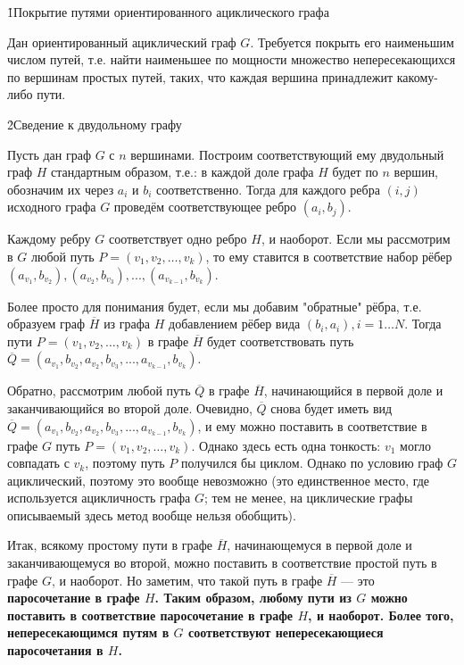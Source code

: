 \h1{Покрытие путями ориентированного ациклического графа}

Дан ориентированный ациклический граф $G$. Требуется покрыть его наименьшим числом путей, т.е. найти наименьшее по мощности множество непересекающихся по вершинам простых путей, таких, что каждая вершина принадлежит какому-либо пути.


\h2{Сведение к двудольному графу}

Пусть дан граф $G$ с $n$ вершинами. Построим соответствующий ему двудольный граф $H$ стандартным образом, т.е.: в каждой доле графа $H$ будет по $n$ вершин, обозначим их через $a_i$ и $b_i$ соответственно. Тогда для каждого ребра $(i, j)$ исходного графа $G$ проведём соответствующее ребро $(a_i, b_j)$.

Каждому ребру $G$ соответствует одно ребро $H$, и наоборот. Если мы рассмотрим в $G$ любой путь $P = (v_1, v_2, \ldots, v_k)$, то ему ставится в соответствие набор рёбер $(a_{v_1}, b_{v_2}), (a_{v_2}, b_{v_3}), ..., (a_{v_{k-1}}, b_{v_k}) $.

Более просто для понимания будет, если мы добавим "обратные" рёбра, т.е. образуем граф $\overline H$ из графа $H$ добавлением рёбер вида $(b_i, a_i), i=1 \ldots N$. Тогда пути $P = (v_1, v_2, \ldots, v_k)$ в графе $\overline H$ будет соответствовать путь $\overline Q = (a_{v_1}, b_{v_2}, a_{v_2}, b_{v_3}, ..., a_{v_{k-1}}, b_{v_k})$.

Обратно, рассмотрим любой путь $\overline Q$ в графе $\overline H$, начинающийся в первой доле и заканчивающийся во второй доле. Очевидно, $\overline Q$ снова будет иметь вид $\overline Q = (a_{v_1}, b_{v_2}, a_{v_2}, b_{v_3}, ..., a_{v_{k-1}}, b_{v_k})$, и ему можно поставить в соответствие в графе $G$ путь $P = (v_1, v_2, \ldots, v_k)$. Однако здесь есть одна тонкость: $v_1$ могло совпадать с $v_k$, поэтому путь $P$ получился бы циклом. Однако по условию граф $G$ ациклический, поэтому это вообще невозможно (это единственное место, где используется ацикличность графа $G$; тем не менее, на циклические графы описываемый здесь метод вообще нельзя обобщить).

Итак, всякому простому пути в графе $\overline H$, начинающемуся в первой доле и заканчивающемуся во второй, можно поставить в соответствие простой путь в графе $G$, и наоборот. Но заметим, что такой путь в графе $\overline H$ --- это \bf{паросочетание} в графе $H$. Таким образом, любому пути из $G$ можно поставить в соответствие паросочетание в графе $H$, и наоборот. Более того, непересекающимся путям в $G$ соответствуют непересекающиеся паросочетания в $H$.

